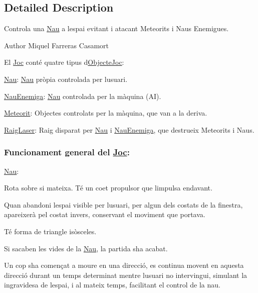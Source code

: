 \subsection{Detailed Description}
Controla una \hyperlink{class_nau}{Nau} a l\textquotesingle{}espai evitant i atacant Meteorits i Naus Enemigues. 

\begin{DoxyAuthor}{Author}
Miquel Farreras Casamort
\end{DoxyAuthor}
El \hyperlink{class_joc}{Joc} conté quatre tipus d\textquotesingle{}\hyperlink{interface_objecte_joc}{Objecte\+Joc}\+:
\begin{DoxyItemize}
\item \hyperlink{class_nau}{Nau}\+: \hyperlink{class_nau}{Nau} pròpia controlada per l\textquotesingle{}usuari.
\item \hyperlink{class_nau_enemiga}{Nau\+Enemiga}\+: \hyperlink{class_nau}{Nau} controlada per la màquina (A\+I).
\item \hyperlink{class_meteorit}{Meteorit}\+: Objectes controlats per la màquina, que van a la deriva.
\item \hyperlink{class_raig_laser}{Raig\+Laser}\+: Raig disparat per \hyperlink{class_nau}{Nau} i \hyperlink{class_nau_enemiga}{Nau\+Enemiga}, que destrueix Meteorits i Naus.
\end{DoxyItemize}

\subsubsection*{Funcionament general del \hyperlink{class_joc}{Joc}\+: }

\hyperlink{class_nau}{Nau}\+:
\begin{DoxyItemize}
\item Rota sobre si mateixa. Té un coet propulsor que l\textquotesingle{}impulsa endavant.
\item Quan abandoni l\textquotesingle{}espai visible per l\textquotesingle{}usuari, per algun dels costats de la finestra, apareixerà pel costat invers, conservant el moviment que portava.
\item Té forma de triangle isòsceles.
\item Si s\textquotesingle{}acaben les vides de la \hyperlink{class_nau}{Nau}, la partida s\textquotesingle{}ha acabat.
\item Un cop s\textquotesingle{}ha començat a moure en una direcció, es continua movent en aquesta direcció durant un temps determinat mentre l\textquotesingle{}usuari no intervingui, simulant la ingravidesa de l\textquotesingle{}espai, i al mateix temps, facilitant el control de la nau.
\end{DoxyItemize}

